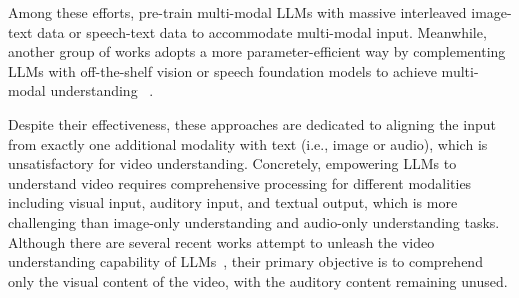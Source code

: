 \documentclass[11pt]{article}
\begin{document}
Among these efforts, \citet{alayrac2022flamingoav,wang2022ofa,huang2023languagein,xu2023mplug2,zhang2023speechgpt,sun2023generative} pre-train multi-modal LLMs with massive interleaved image-text data or speech-text data to accommodate multi-modal input. Meanwhile, another group of works adopts a more parameter-efficient way by complementing LLMs with off-the-shelf vision or speech foundation models to achieve multi-modal understanding ~\citep{li2023blip2bl,zhu2023minigpt,liu2023visualit,ye2023mplugowl,zhang2023vpgtrans,huang2023audiogpt,wu2023onda,pandagpt,li2023otter}. 

Despite their effectiveness, these approaches are dedicated to aligning the input from exactly one additional modality with text (i.e., image or audio), which is unsatisfactory for video understanding. Concretely, empowering LLMs to understand video requires comprehensive processing  for different modalities including visual input, auditory input, and textual output, which is more challenging than image-only understanding and audio-only understanding tasks.
Although there are several recent works attempt to unleash the video understanding capability of LLMs~\citep{li2023videochatcv,maaz2023videochatgpt,luo2023valley}, their primary objective is to comprehend only the visual content of the video, with the auditory content remaining unused.



\begin{table}[t!]
\centering
{}
\caption{Comparison with popular multi-modal large language models. Video-LLaMA has the unique ability to comprehend auditory and visual information simultaneously.}
\label{tab.comparison}
\end{table}
\end{document}
